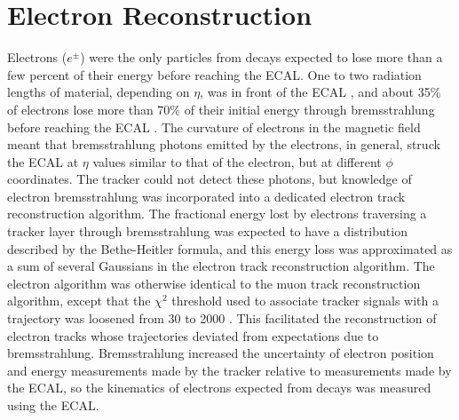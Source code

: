 \section{Electron Reconstruction}
\label{sec:eleReco}
Electrons ($e^{\pm}$) were the only particles from \WR decays expected to lose more than a few percent of their 
energy before reaching the ECAL.  One to two radiation lengths of material, depending on $\eta$, was in front of 
the ECAL \cite{ecalPerformanceInCollisions}, and about 35\% of electrons lose more than 70\% of their initial energy 
through bremsstrahlung before reaching the ECAL \cite{trackerPerformanceInCollisions}.  The curvature of electrons 
in the magnetic field meant that bremsstrahlung photons emitted by the electrons, in general, struck the ECAL 
at $\eta$ values similar to that of the electron, but at different $\phi$ coordinates.  The tracker could not detect 
these photons, but knowledge of electron bremsstrahlung was incorporated into a dedicated electron track reconstruction 
algorithm.  The fractional energy lost by electrons traversing a tracker layer through bremsstrahlung was expected to 
have a distribution described by the Bethe-Heitler formula, and this energy loss was approximated as a sum of 
several Gaussians in the electron track reconstruction algorithm.  The electron algorithm was otherwise identical to 
the muon track reconstruction algorithm, except that the $\chi^{2}$ threshold used to 
associate tracker signals with a trajectory was loosened from 30 to 2000 \cite{trackerPerformanceInCollisions}.  This 
facilitated the reconstruction of electron tracks whose trajectories deviated from expectations due to bremsstrahlung.  
Bremsstrahlung increased the uncertainty of electron position and energy measurements made by the tracker relative to 
measurements made by the ECAL, so the kinematics of electrons expected from \WR decays was measured using the ECAL.

